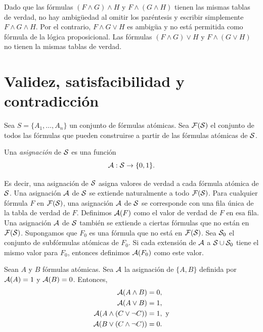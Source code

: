 \documentclass[12pt,a4paper]{book}
\begin{document}
    Dado que las fórmulas $(F\wedge G)\wedge H$ y $F\wedge(G\wedge H)$ tienen las mismas tablas de verdad, no hay ambigüedad al omitir los paréntesis y escribir
    simplemente $F\wedge G\wedge H$. Por el contrario, $F\wedge G\vee H$ es ambigüa y no está permitida como fórmula de la lógica proposicional. Las
    fórmulas $(F\wedge G)\vee H$ y $F\wedge(G\vee H)$ no tienen la mismas tablas de verdad.

    \section{Validez, satisfacibilidad y contradicción}

    Sea $S=\{A_{1},\dots,A_{n}\}$ un conjunto de fórmulas atómicas. Sea $\FF(\SS)$ el conjunto de todos las fórmulas que
    pueden construirse a partir de las fórmulas atómicas de $\SS$.

    \begin{definicion}[Asignación]
        Una \textit{asignación} de $\SS$ es una función
        \begin{equation*}
            \AA:\SS\to\{0,1\}.
        \end{equation*}
    \end{definicion}

    Es decir, una asignación de $\SS$ asigna valores de verdad a cada fórmula atómica de $\SS$. Una asignación $\AA$ de $\SS$ se extiende naturalmente a todo
    $\FF(\SS)$. Para cualquier fórmula $F$ en $\FF(\SS)$, una asignación $\AA$ de $\SS$ se corresponde con una fila única de la tabla de verdad de $F$.
    Definimos $\AA(F)$ como el valor de verdad de $F$ en esa fila. Una asignación $\AA$ de $\SS$ también se extiende a ciertas fórmulas que no están en $\FF(\SS)$.
    Supongamos que $F_{0}$ es una fórmula que no está en $\FF(\SS)$. Sea $\SS_{0}$ el conjunto de subfórmulas atómicas de $F_{0}$. Si cada extensión de $\AA$
    a $\SS\cup\SS_{0}$ tiene el mismo valor para $F_{0}$, entonces definimos $\AA(F_{0})$ como este valor.

    \begin{ejemplo}
        Sean $A$ y $B$ fórmulas atómicas. Sea $\AA$ la asignación de $\{A,B\}$ definida por $\AA(A)=1$ y $\AA(B)=0$. Entonces,
        \begin{align*}
            \AA(A\wedge B)&=0,\\
            \AA(A\vee B)&=1,\\
            \AA(A\wedge(C\vee\neg C))&=1,\text{ y}\\
            \AA(B\vee(C\wedge\neg C))&=0.
        \end{align*}
    \end{ejemplo}
\end{document}

